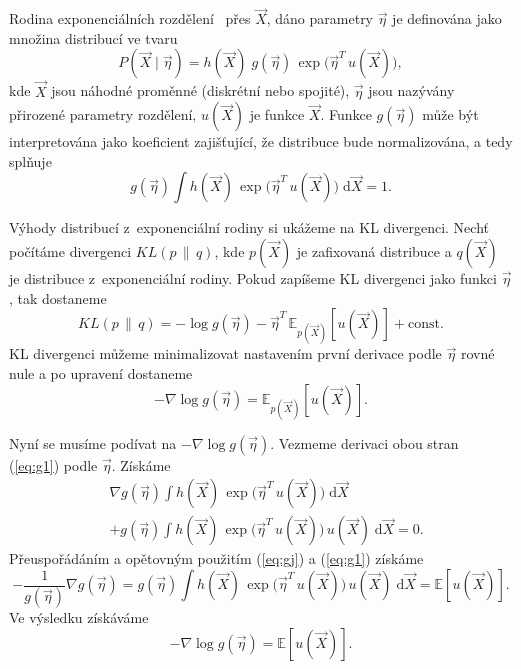 Rodina exponenciálních rozdělení~\cite{bernardo2009bayesian} přes $\vec{X}$, dáno parametry $\vec\eta$ je definována jako množina distribucí ve tvaru
\begin{equation}
P(\vec{X} \mid \vec\eta) = h(\vec{X}) \; g(\vec\eta) \,\exp\big(\vec\eta^T \, u(\vec{X})\big),
\label{eq:gj}
\end{equation}
kde $\vec{X}$ jsou náhodné proměnné (diskrétní nebo spojité), $\vec\eta$ jsou nazývány přirozené parametry rozdělení, $u(\vec{X})$ je funkce $\vec{X}$.
Funkce $g(\vec\eta)$ může být interpretována jako koeficient zajišťující, že distribuce bude normalizována, a tedy splňuje
\begin{equation}
g(\vec\eta) \int h(\vec{X}) \, \exp \big(\vec\eta^T \, u(\vec{X})\big) \; \mathrm{d}\vec{X} = 1.
\label{eq:g1}
\end{equation}

Výhody distribucí z~exponenciální rodiny si ukážeme na KL divergenci.
Nechť počítáme divergenci $KL(p\, \|\, q)$, kde $p(\vec{X})$ je zafixovaná distribuce a $q(\vec{X})$ je distribuce z~exponenciální rodiny.
Pokud zapíšeme KL divergenci jako funkci $\vec\eta$, tak dostaneme
\begin{equation}
KL(p \,\|\, q) = - \log g(\vec\eta) - \vec\eta^T \, \mathbb{E}_{p(\vec{X})}[u(\vec{X})] + \mathrm{const}.
\end{equation}
KL divergenci můžeme minimalizovat nastavením první derivace podle $\vec\eta$ rovné nule a po upravení dostaneme
\begin{equation}
-\nabla \log g(\vec\eta) = \mathbb{E}_{p(\vec{X})}[u(\vec{X})].
\label{eq:kl}
\end{equation}

Nyní se musíme podívat na $- \nabla \log g(\vec\eta)$.
Vezmeme derivaci obou stran (\ref{eq:g1}) podle $\vec\eta$.
Získáme
\begin{align}
& \nabla g(\vec\eta) \int h(\vec{X}) \, \exp \big(\vec\eta^T \, u(\vec{X}) \big) \; \mathrm{d}\vec{X} \\
& + g(\vec\eta) \int h(\vec{X}) \, \exp \big(\vec\eta^T \,u(\vec{X})\big) \, u(\vec{X}) \; \mathrm{d}\vec{X} = 0. \nonumber
\end{align}
Přeuspořádáním a opětovným použitím (\ref{eq:gj}) a (\ref{eq:g1}) získáme
\begin{equation}
-\frac{1}{g(\vec\eta)}\nabla g(\vec\eta)
= g(\vec\eta) \int h(\vec{X}) \, \exp\big(\vec\eta^T \, u(\vec{X})\big) \, u(\vec{X})\; \mathrm{d}\vec{X} = \mathbb{E}[u(\vec{X})].
\end{equation}
Ve výsledku získáváme 
\begin{equation}
- \nabla \log g(\vec\eta) = \mathbb{E}[u(\vec{X})].
\label {eq:ge}
\end{equation}

